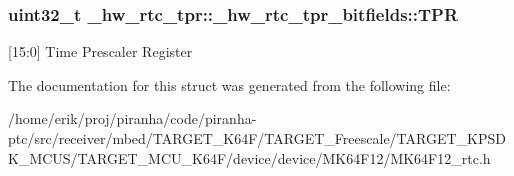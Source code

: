 \subsubsection[{\texorpdfstring{T\+PR}{TPR}}]{\setlength{\rightskip}{0pt plus 5cm}uint32\+\_\+t \+\_\+hw\+\_\+rtc\+\_\+tpr\+::\+\_\+hw\+\_\+rtc\+\_\+tpr\+\_\+bitfields\+::\+T\+PR}\hypertarget{struct__hw__rtc__tpr_1_1__hw__rtc__tpr__bitfields_a3f6036203db66ad793c3898533cc5a59}{}\label{struct__hw__rtc__tpr_1_1__hw__rtc__tpr__bitfields_a3f6036203db66ad793c3898533cc5a59}
\mbox{[}15\+:0\mbox{]} Time Prescaler Register 

The documentation for this struct was generated from the following file\+:\begin{DoxyCompactItemize}
\item 
/home/erik/proj/piranha/code/piranha-\/ptc/src/receiver/mbed/\+T\+A\+R\+G\+E\+T\+\_\+\+K64\+F/\+T\+A\+R\+G\+E\+T\+\_\+\+Freescale/\+T\+A\+R\+G\+E\+T\+\_\+\+K\+P\+S\+D\+K\+\_\+\+M\+C\+U\+S/\+T\+A\+R\+G\+E\+T\+\_\+\+M\+C\+U\+\_\+\+K64\+F/device/device/\+M\+K64\+F12/M\+K64\+F12\+\_\+rtc.\+h\end{DoxyCompactItemize}
